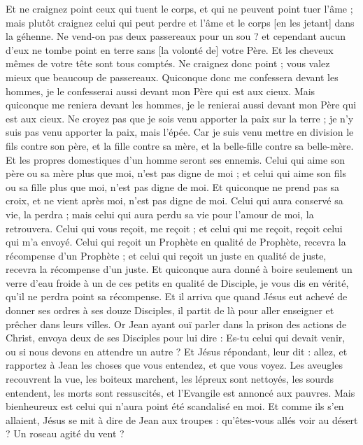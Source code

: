 \begin{multicols}{2}
Et ne craignez point ceux qui tuent le corps, et qui ne peuvent point tuer l'âme ; mais plutôt craignez celui qui peut perdre et l'âme et le corps [en les jetant] dans la géhenne.
Ne vend-on pas deux passereaux pour un sou ? et cependant aucun d'eux ne tombe point en terre sans [la volonté de] votre Père.
Et les cheveux mêmes de votre tête sont tous comptés.
Ne craignez donc point ; vous valez mieux que beaucoup de passereaux.
Quiconque donc me confessera devant les hommes, je le confesserai aussi devant mon Père qui est aux cieux.
Mais quiconque me reniera devant les hommes, je le renierai aussi devant mon Père qui est aux cieux.
Ne croyez pas que je sois venu apporter la paix sur la terre ; je n'y suis pas venu apporter la paix, mais l'épée.
Car je suis venu mettre en division le fils contre son père, et la fille contre sa mère, et la belle-fille contre sa belle-mère.
Et les propres domestiques d'un homme seront ses ennemis.
Celui qui aime son père ou sa mère plus que moi, n'est pas digne de moi ; et celui qui aime son fils ou sa fille plus que moi, n'est pas digne de moi.
Et quiconque ne prend pas sa croix, et ne vient après moi, n'est pas digne de moi.
Celui qui aura conservé sa vie, la perdra ; mais celui qui aura perdu sa vie pour l'amour de moi, la retrouvera.
Celui qui vous reçoit, me reçoit ; et celui qui me reçoit, reçoit celui qui m'a envoyé.
Celui qui reçoit un Prophète en qualité de Prophète, recevra la récompense d'un Prophète ; et celui qui reçoit un juste en qualité de juste, recevra la récompense d'un juste.
Et quiconque aura donné à boire seulement un verre d'eau froide à un de ces petits en qualité de Disciple, je vous dis en vérité, qu'il ne perdra point sa récompense.
\VerseOne{}Et il arriva que quand Jésus eut achevé de donner ses ordres à ses douze Disciples, il partit de là pour aller enseigner et prêcher dans leurs villes.
Or Jean ayant ouï parler dans la prison des actions de Christ, envoya deux de ses Disciples pour lui dire :
Es-tu celui qui devait venir, ou si nous devons en attendre un autre ?
Et Jésus répondant, leur dit : allez, et rapportez à Jean les choses que vous entendez, et que vous voyez.
Les aveugles recouvrent la vue, les boiteux marchent, les lépreux sont nettoyés, les sourds entendent, les morts sont ressuscités, et l'Evangile est annoncé aux pauvres.
Mais bienheureux est celui qui n'aura point été scandalisé en moi.
Et comme ils s'en allaient, Jésus se mit à dire de Jean aux troupes : qu'êtes-vous allés voir au désert ? Un roseau agité du vent ?

\end{multicols}
